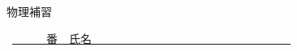 \documentclass[a4paper,9pt]{jsarticle}
\begin{document}
\hakosyokika
\begin{center}
{\Large 物理補習}
\end{center}
\hfill ~\underline{~~~~~~番　氏名~~~~~~~~~~~~~~~~~~~~~~~~~~~~~~~~~~~}
\hakosyokika

\begin{enumerate}
% 
% 
% 
% 
% 
% 
% 
% 
% 
% 
% 
% 
% 
% 
% 
% 

\newpage

\newpage

\newpage

\newpage

\newpage

\newpage

\newpage

% 
% 
% 
% 
% 
% 

\vfill
\end{enumerate}
\end{document}

